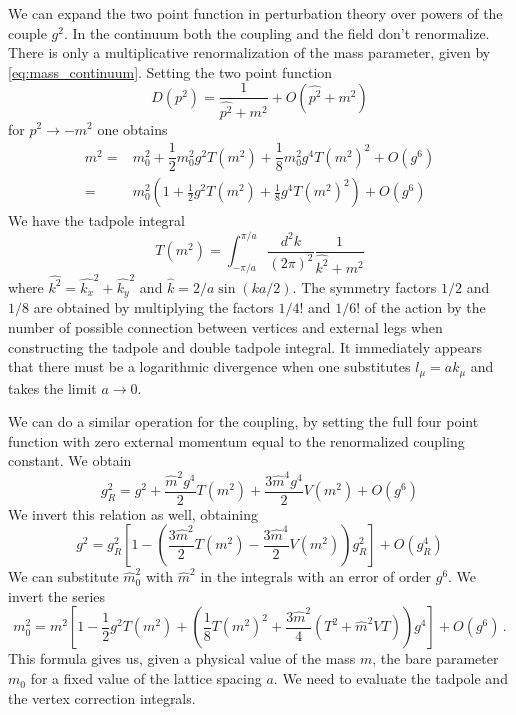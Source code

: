 \documentclass[12pt,a4paper]{report}
\begin{document}
  We can expand the two point function in perturbation theory over powers of the couple $g^2$. In the continuum both the coupling and the field don't renormalize. There is only a multiplicative renormalization of the mass parameter, given by \eqref{eq:mass_continuum}. Setting the two point function \begin{equation}
  D(p^2) = \dfrac{1}{\hat{p^2}+ m^2} +O(\hat{p^2} +m^2)
\end{equation}  for $p^2 \to -m^2$ one obtains \begin{align}
\label{eq:renormalisedmass}
  m^2=&   m_0^2  +\dfrac{1}{2}   m_0^2 g^2 T( m^2)+ \dfrac{1}{8}  m_0^2 g^4 T( m^2)^2 + O(g^6) \\
 = &  m_0^2 (1 + \frac{1}{2}g^2 T( m^2) + \frac{1}{8} g^4 T( m^2)^2 ) + O(g^6 )
 \end{align} We have  the tadpole integral \begin{equation}
 \label{eq:tadpole}
 T(m^2) = \int_{-\pi/a}^{\pi/a} \dfrac{d^2k}{(2 \pi)^2} \dfrac{1}{\hat{k^2} + m^2
  }
 \end{equation} where $\hat{k^2} = \hat{k_x}^2 + \hat{k_y}^2$ and $\hat k = 2/a \sin (ka/2)$. The symmetry factors $1/2$ and $1/8$ are obtained by multiplying the factors $1/4!$ and $1/6!$ of the action by the number of possible connection between vertices and external legs when constructing the tadpole and double tadpole integral.
 It immediately appears that there must be a logarithmic divergence when one substitutes $l_\mu = a k_\mu$ and takes the limit $a\to 0$. 

 
 We can do a similar operation for the coupling, by setting the full four point function with zero external momentum equal to the renormalized coupling constant. We obtain \begin{equation}
 g_R^2 = g^2 +\dfrac{\hat m^2 g^4}{2} T(m^2) + \dfrac{3 \hat
  m^4 g^4}{2} V(m^2) + O(g^6)
\end{equation} We invert this relation as well, obtaining \begin{equation}
g^2 = g_R^2\left[1- \left(\dfrac{3 \hat m^2}{2}T(m^2) - \dfrac{3\hat  m^4}{2}V(m^2) \right)g_R^2 \right] + O(g_R^4)
\end{equation} 
 We can substitute $\hat m_0^2$ with $\hat m^2$ in the integrals with an error of order $g^6$. We invert the series \begin{equation}
  m_0^2 =  m^2\left[1 - \frac{1}{2}g^2 T(  m^2) + \left( \frac{1}{8}  T(m^2)^2+ \dfrac{3 \hat m^2}{4}(T^2 + \hat m^2 V T) \right) g^4  \right] + O( g^6 ) \,.
 \end{equation} This formula gives us, given a physical value of the mass $m$, the bare parameter $m_0$ for a fixed value of the lattice spacing $a$. We need to evaluate the tadpole and the vertex correction integrals.
  
\end{document}
